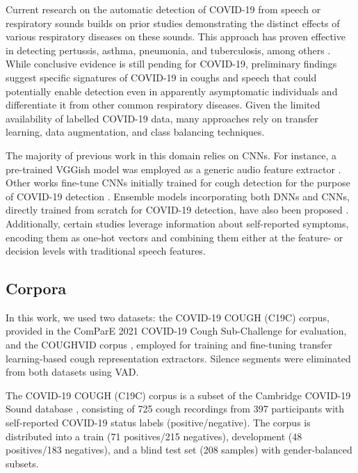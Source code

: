 Current research on the automatic detection of COVID-19 from speech or respiratory sounds builds on prior studies demonstrating the distinct effects of various respiratory diseases on these sounds. This approach has proven effective in detecting pertussis, asthma, pneumonia, and tuberculosis, among others \cite{pramono2016cough}. While conclusive evidence is still pending for COVID-19, preliminary findings suggest specific signatures of COVID-19 in coughs and speech that could potentially enable detection even in apparently asymptomatic individuals and differentiate it from other common respiratory diseases. Given the limited availability of labelled COVID-19 data, many approaches rely on transfer learning, data augmentation, and class balancing techniques.

The majority of previous work in this domain relies on \acp{CNN}. For instance, a pre-trained VGGish model \cite{Hershey2017} was employed as a generic audio feature extractor \cite{Chloe2020}. Other works fine-tune \acp{CNN} initially trained for cough detection for the purpose of COVID-19 detection \cite{Bagad2020,Imran2020}. Ensemble models incorporating both \acp{DNN} and \acp{CNN}, directly trained from scratch for COVID-19 detection, have also been proposed \cite{Chaudhari2021}. Additionally, certain studies  \cite{Han2021} leverage information about self-reported symptoms, encoding them as one-hot vectors and combining them either at the feature- or decision levels with traditional speech features.

\subsection{Corpora}
In this work, we used two datasets: the COVID-19 COUGH (C19C) corpus, provided in the ComParE 2021 COVID-19 Cough Sub-Challenge \cite{Chloe2020,Han2021} for evaluation, and the COUGHVID corpus \cite{Orlandic2020}, employed for training and fine-tuning transfer learning-based cough representation extractors. Silence segments were eliminated from both datasets using \ac{VAD}.

The COVID-19 COUGH (C19C) corpus is a subset of the Cambridge COVID-19 Sound database \cite{Chloe2020,Han2021}, consisting of 725 cough recordings from 397 participants with self-reported COVID-19 status labels (positive/negative). The corpus is distributed into a train (71 positives/215 negatives), development (48 positives/183 negatives), and a blind test set (208 samples) with gender-balanced subsets. 

